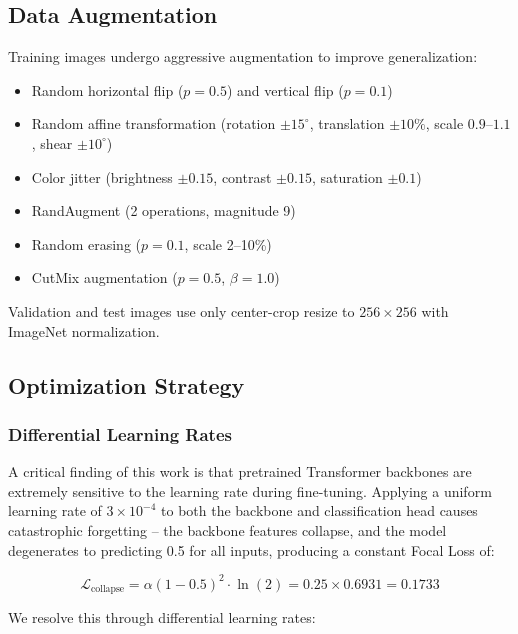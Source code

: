 \documentclass[12pt,a4paper]{report}
\begin{document}
\subsection{Data Augmentation}

Training images undergo aggressive augmentation to improve generalization:

\begin{itemize}
    \item Random horizontal flip ($p = 0.5$) and vertical flip ($p = 0.1$)
    \item Random affine transformation (rotation $\pm 15^\circ$, translation $\pm 10\%$, scale $0.9$--$1.1$, shear $\pm 10^\circ$)
    \item Color jitter (brightness $\pm 0.15$, contrast $\pm 0.15$, saturation $\pm 0.1$)
    \item RandAugment (2 operations, magnitude 9) \cite{cubuk2020randaugment}
    \item Random erasing ($p = 0.1$, scale 2--10\%)
    \item CutMix augmentation ($p = 0.5$, $\beta = 1.0$) \cite{yun2019cutmix}
\end{itemize}

Validation and test images use only center-crop resize to $256 \times 256$ with ImageNet normalization.

\subsection{Optimization Strategy}

\subsubsection{Differential Learning Rates}

A critical finding of this work is that pretrained Transformer backbones are extremely sensitive to the learning rate during fine-tuning. Applying a uniform learning rate of $3 \times 10^{-4}$ to both the backbone and classification head causes catastrophic forgetting -- the backbone features collapse, and the model degenerates to predicting 0.5 for all inputs, producing a constant Focal Loss of:

\begin{equation}
    \mathcal{L}_{\text{collapse}} = \alpha (1 - 0.5)^2 \cdot \ln(2) = 0.25 \times 0.6931 = 0.1733
    \label{eq:collapse}
\end{equation}

We resolve this through differential learning rates:
\end{document}
